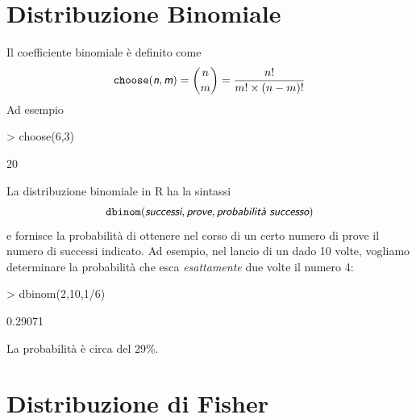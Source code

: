 \documentclass[onecolumn,11pt]{book}
\newcommand{\varia}[1]{\textsl{\textsf{#1}}}
\begin{document}
\section{Distribuzione Binomiale}
Il coefficiente binomiale \`e definito come 
\begin{equation*} \texttt{choose}(\varia{n},\varia{m})={n \choose m}=\dfrac{n!}{m!\times (n-m)!}\end{equation*}
Ad esempio  
\begin{Schunk}
\begin{Sinput}
> choose(6,3)
\end{Sinput}
\begin{Soutput}
[1] 20
\end{Soutput}
\end{Schunk}
La distribuzione binomiale in \textsf{R} ha la sintassi $$\texttt{dbinom}(\varia{successi},\varia{prove},
\varia{probabilit\`a successo})$$ e fornisce la  probabilit\`a di ottenere nel corso di un certo numero di prove  il numero di successi indicato.
Ad esempio, nel lancio di un dado 10 volte, vogliamo determinare la  probabilit\`a che esca  \emph{esattamente} due volte il numero 4:
\begin{Schunk}
\begin{Sinput}
> dbinom(2,10,1/6)
\end{Sinput}
\begin{Soutput}
[1] 0.29071
\end{Soutput}
\end{Schunk}

La  probabilit\`a \`e circa del 29\%.

 
\section{Distribuzione di Fisher} 
\end{document}
